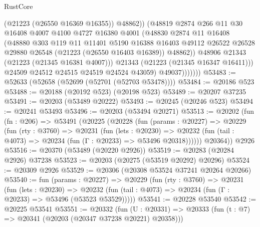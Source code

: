 \begin{lexlean}{RustCore}
\begin{coremodule}
                          (@21223 (@26550 @16369 @16355))
                          @48862))
                      (@48819
                        @2874
                        @266
                        @11
                        @30
                        @16408
                        @4007
                        @4100
                        @4727
                        @16380
                        @4001
                        (@48830
                          @2874
                          @11
                          @16408
                          (@48880
                            @303
                            @119
                            @11
                            @11401
                            @5190
                            @16388
                            @16403
                            @49112
                            @26522
                            @26528
                            @29880
                            @26548
                            (@21223 (@26550 @16403 @16389))
                            @48862))
                        @48906
                        @21343
                        (@21223 (@21345 @16381 @4007)))
                      @21343
                      (@21223 (@21345 @16347 @16411)))
                    @24509
                    @24512
                    @24515
                    @24519
                    @24524
                    @43059)
                  @49037)))))))
@53483 := @52633 (@52658 (@52699 (@52701 (@52703 @53478))))
@53484 := @20186 @523
@53488 := @20188 (@20192 @523) (@20198 @523)
@53489 := @20207 @37235
@53491 := @20203 (@53489 @20222)
@53493 := @20245 (@20246 @523)
@53494 := @20241 @53493
@53496 := @20203 (@53494 @20271)
@53513 := @20202
    (fun (fn : @206) =>
    @53491
      (@20225
        (@20228
          (fun (params : @20227) =>
          @20229
            (fun (rty : @3760) =>
            @20231
              (fun (lets : @20230) =>
              @20232 (fun (tail : @4073) => @20234 (fun (Γ : @20233) => @53496 @20318))))))
        @20364))
    @2926
@53516 := @20370 (@53489 (@20220 @2926))
@53519 := @20283 (@20284 @2926) @37238
@53523 := @20203 (@20275 (@53519 @20292) @20296)
@53524 := @20309 @2926
@53529 := @20306 (@20308 @53524 @37241 @20264 @20266)
@53540 := fun (params : @20227) =>
  @20229
    (fun (rty : @3760) =>
    @20231
      (fun (lets : @20230) =>
      @20232 (fun (tail : @4073) => @20234 (fun (Γ : @20233) => @53496 (@53523 @53529)))))
@53541 := @20228 @53540
@53542 := @20225 @53541
@53551 := @20332
    (fun (U : @20331) => @20333 (fun (t : @7) => @20341 (@20203 (@20347 @37238 @20221) @20358)))

\end{coremodule}
\end{lexlean}
